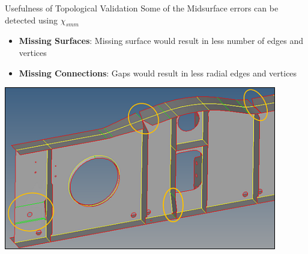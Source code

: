 \begin{frame}{Usefulness of Topological Validation}
Some of the Midsurface errors can be detected using $\chi_{smm}$
\begin{itemize}[noitemsep,label=\textbullet,topsep=2pt,parsep=2pt,partopsep=2pt]
\item \textbf{Missing Surfaces}: Missing surface would result in less number of edges and vertices
\item \textbf{Missing Connections}: Gaps would result in less radial edges and vertices 
\end{itemize}
\begin{center}
\includegraphics[width=0.5\linewidth]{../Common/images/MidsurfaceProblems}
\end{center}

\end{frame}


